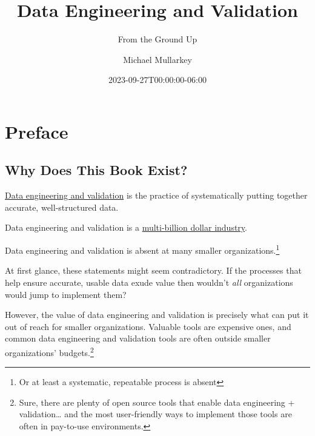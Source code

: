 \documentclass[
  letterpaper,
  DIV=11,
  numbers=noendperiod]{scrreprt}
\title{Data Engineering and Validation}
\subtitle{From the Ground Up}
\author{Michael Mullarkey}
\date{2023-09-27T00:00:00-06:00}
\renewcommand*\contentsname{Table of contents}
\newcommand\contentsname{Table of contents}
\begin{document}
\maketitle
\ifdefined\Shaded\renewenvironment{Shaded}{\begin{tcolorbox}[interior hidden, boxrule=0pt, sharp corners, enhanced, frame hidden, breakable, borderline west={3pt}{0pt}{shadecolor}]}{\end{tcolorbox}}\fi

\renewcommand*\contentsname{Table of contents}
{
\hypersetup{linkcolor=}
\setcounter{tocdepth}{2}
\tableofcontents
}

\hypertarget{preface}{%
\chapter*{Preface}\label{preface}}

\hypertarget{why-does-this-book-exist}{%
\section*{Why Does This Book Exist?}\label{why-does-this-book-exist}}

\href{https://blog.pragmaticengineer.com/what-is-data-engineering/}{Data
engineering and validation} is the practice of systematically putting
together accurate, well-structured data.

Data engineering and validation is a
\href{https://finance.yahoo.com/news/big-data-engineering-services-market-125600472.html}{multi-billion
dollar industry}.

Data engineering and validation is absent at many smaller
organizations.\footnote{Or at least a systematic, repeatable process is
  absent}

At first glance, these statements might seem contradictory. If the
processes that help ensure accurate, usable data exude value then
wouldn't \emph{all} organizations would jump to implement them?

However, the value of data engineering and validation is precisely what
can put it out of reach for smaller organizations. Valuable tools are
expensive ones, and common data engineering and validation tools are
often outside smaller organizations' budgets.\footnote{Sure, there are
  plenty of open source tools that enable data engineering +
  validation\ldots{} and the most user-friendly ways to implement those
  tools are often in pay-to-use environments.}
\end{document}
